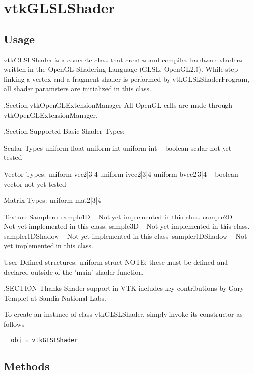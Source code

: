 \section{vtkGLSLShader}

\subsection{Usage}

 vtkGLSLShader is a concrete class that creates and compiles hardware
 shaders written in the OpenGL Shadering Language (GLSL, OpenGL2.0).
 While step linking a vertex and a fragment shader is performed by
 vtkGLSLShaderProgram, all shader parameters are initialized in this
 class.

 .Section vtkOpenGLExtensionManager
 All OpenGL calls are made through vtkOpenGLExtensionManager.

 .Section Supported Basic Shader Types:

 Scalar Types
 uniform float
 uniform int
 uniform int -- boolean scalar not yet tested

 Vector Types:
 uniform vec{2|3|4}
 uniform ivec{2|3|4}
 uniform bvec{2|3|4} -- boolean vector not yet tested

 Matrix Types:
 uniform mat{2|3|4}

 Texture Samplers:
 sample1D -- Not yet implemented in this cless.
 sample2D -- Not yet implemented in this class.
 sample3D -- Not yet implemented in this class.
 sampler1DShadow -- Not yet implemented in this class.
 sampler1DShadow -- Not yet implemented in this class.
 
 User-Defined structures:
 uniform struct
  NOTE: these must be defined and declared  outside of the 'main' shader
  function.


 .SECTION Thanks
 Shader support in VTK includes key contributions by Gary Templet at 
 Sandia National Labs.

To create an instance of class vtkGLSLShader, simply
invoke its constructor as follows
\begin{verbatim}
  obj = vtkGLSLShader
\end{verbatim}
\subsection{Methods}

